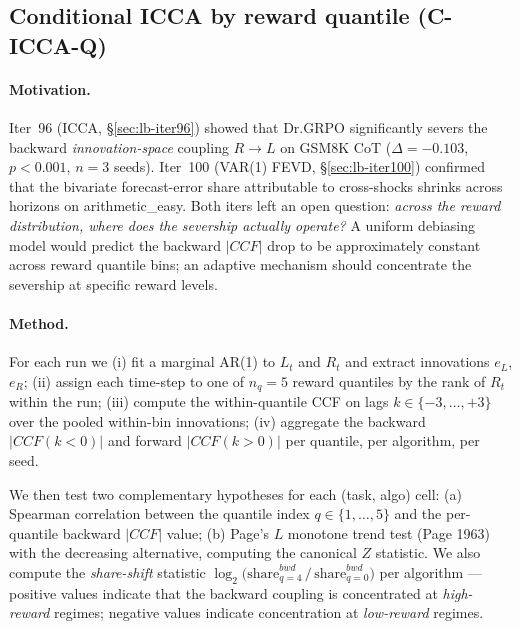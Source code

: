 
\subsection{Conditional ICCA by reward quantile (C-ICCA-Q)}
\label{sec:length-bias-iter104}

\paragraph{Motivation.}
Iter~96 (ICCA, \S\ref{sec:lb-iter96}) showed that Dr.GRPO significantly
severs the backward \emph{innovation-space} coupling $R\to L$ on GSM8K CoT
($\Delta = -0.103$, $p<0.001$, $n=3$ seeds). Iter~100
(VAR(1) FEVD, \S\ref{sec:lb-iter100}) confirmed that the bivariate forecast-error share attributable
to cross-shocks shrinks across horizons on arithmetic\_easy. Both iters left
an open question: \emph{across the reward distribution, where does the
severship actually operate?} A uniform debiasing model would predict the
backward $|CCF|$ drop to be approximately constant across reward quantile
bins; an adaptive mechanism should concentrate the severship at
specific reward levels.

\paragraph{Method.}
For each run we (i) fit a marginal AR(1) to $L_t$ and $R_t$ and extract
innovations $e_L$, $e_R$; (ii) assign each time-step to one of
$n_q=5$ reward quantiles by the rank of $R_t$ within the run; (iii)
compute the within-quantile CCF on lags $k\in\{-3,\dots,+3\}$ over the
pooled within-bin innovations; (iv) aggregate the backward
$|CCF(k<0)|$ and forward $|CCF(k>0)|$ per quantile, per algorithm, per
seed.

We then test two complementary hypotheses for each (task, algo) cell:
(a) Spearman correlation between the quantile index $q\in\{1,\dots,5\}$
and the per-quantile backward $|CCF|$ value; (b) Page's $L$ monotone
trend test (Page 1963) with the decreasing alternative, computing the
canonical $Z$ statistic. We also compute the
\emph{share-shift} statistic
$\log_2\!\bigl(\mathrm{share}^{bwd}_{q=4} \,/\, \mathrm{share}^{bwd}_{q=0}\bigr)$
per algorithm --- positive values indicate that the backward coupling is
concentrated at \emph{high-reward} regimes; negative values indicate
concentration at \emph{low-reward} regimes.

